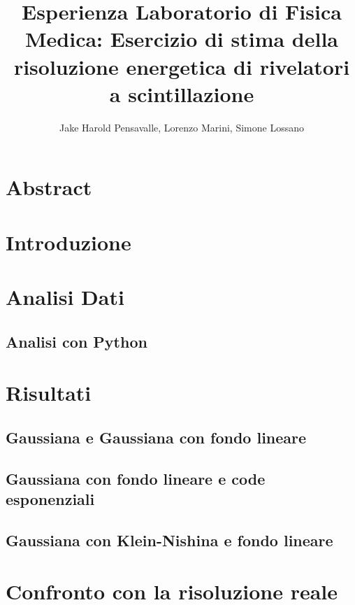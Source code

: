 \documentclass[a4paper]{article}
\title{Esperienza Laboratorio di Fisica Medica: Esercizio di stima della risoluzione energetica di rivelatori a scintillazione}
\author{Jake Harold Pensavalle, Lorenzo Marini, Simone Lossano}
\begin{document}
	\maketitle
	\newpage
	\tableofcontents
	\newpage
\section{Abstract}


\section{Introduzione}


\section{Analisi Dati}


\subsection{Analisi con Python}


\section{Risultati}



\subsection{Gaussiana e Gaussiana con fondo lineare}


\subsection{Gaussiana con fondo lineare e code esponenziali}


\subsection{Gaussiana con Klein-Nishina e fondo lineare}


\section{Confronto con la risoluzione reale}
\end{document}
